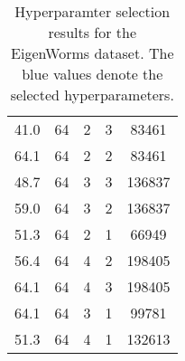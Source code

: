 \begin{table}[t]
\begin{center}
\begin{tabular}{ccccc}
        41.0 &         64 &                        2 &          3 &       83461 \\
        64.1 &         64 &                        2 &          2 &       83461 \\
        48.7 &         64 &                        3 &          3 &      136837 \\
        59.0 &         64 &                        3 &          2 &      136837 \\
        51.3 &         64 &                        2 &          1 &       66949 \\
        56.4 &         64 &                        4 &          2 &      198405 \\
        64.1 &         64 &                        4 &          3 &      198405 \\
        64.1 &         64 &                        3 &          1 &       99781 \\
        51.3 &         64 &                        4 &          1 &      132613 \\
        \bottomrule
        \end{tabular}
    \end{center}
    \caption{Hyperparamter selection results for the EigenWorms dataset. The blue values denote the selected hyperparameters.}
    \label{tab:eigenworms_hyper}
\end{table}